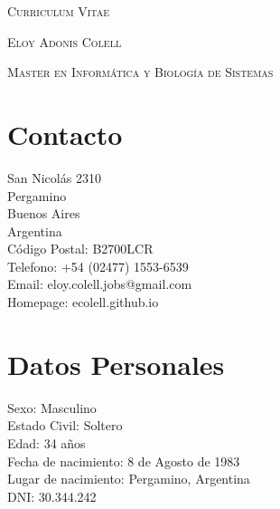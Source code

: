 \documentclass[a4paper]{article}
\begin{document}
\pagestyle{plain}

\begin{center}
\huge{\textsc{Curriculum Vitae}}
\vspace{\baselineskip}

\Large{\textsc{Eloy Adonis Colell}}
\vspace{\baselineskip}

\small{\textsc{Master en Inform{\'a}tica y Biolog{\'i}a de Sistemas}}
\end{center}
\vspace{1.5\baselineskip}

\section{Contacto}
\begin{flushleft}
San Nicol{\'a}s 2310 \\
Pergamino \\
Buenos Aires \\
Argentina \\
C{\'o}digo Postal: B2700LCR \\
Telefono: +54 (02477) 1553-6539 \\
Email: eloy.colell.jobs@gmail.com \\
Homepage: ecolell.github.io\\
\end{flushleft}

\section{Datos Personales}
\begin{flushleft}
Sexo: Masculino \\
Estado Civil: Soltero \\
Edad: 34 a\~{n}os \\
Fecha de nacimiento: 8 de Agosto de 1983 \\
Lugar de nacimiento: Pergamino, Argentina \\
DNI: 30.344.242 \\
\end{flushleft}
\end{document}
